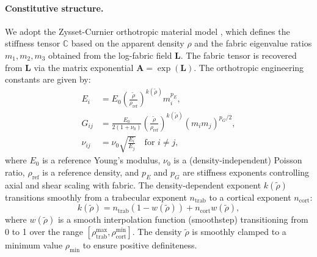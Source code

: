 \paragraph{Constitutive structure.}
We adopt the Zysset-Curnier orthotropic material model \cite{Zysset1995_AlternativeModelAnisotropic}, which defines the stiffness tensor $\mathbb{C}$ based on the apparent density $\rho$ and the fabric eigenvalue ratios $m_1, m_2, m_3$ obtained from the log-fabric field $\mathbf{L}$. The fabric tensor is recovered from $\mathbf{L}$ via the matrix exponential $\mathbf{A} = \exp(\mathbf{L})$.
The orthotropic engineering constants are given by:
\begin{equation}\label{eq:zysset-curnier}
\begin{aligned}
    E_i &= E_0 \left(\frac{\widetilde{\rho}}{\rho_{\mathrm{ref}}}\right)^{k(\widetilde{\rho})} m_i^{p_E}, \\
    G_{ij} &= \frac{E_0}{2(1+\nu_0)} \left(\frac{\widetilde{\rho}}{\rho_{\mathrm{ref}}}\right)^{k(\widetilde{\rho})} (m_i m_j)^{p_G/2}, \\
    \nu_{ij} &= \nu_0 \sqrt{\frac{E_i}{E_j}} \quad \text{for } i\neq j,
\end{aligned}
\end{equation}
where $E_0$ is a reference Young's modulus, $\nu_0$ is a (density-independent) Poisson ratio, $\rho_{\mathrm{ref}}$ is a reference density, and $p_E$ and $p_G$ are stiffness exponents controlling axial and shear scaling with fabric. The density-dependent exponent $k(\widetilde{\rho})$ transitions smoothly from a trabecular exponent $n_{\mathrm{trab}}$ to a cortical exponent $n_{\mathrm{cort}}$:
\begin{equation}\label{eq:variable-exponent}
k(\widetilde{\rho}) = n_{\mathrm{trab}} (1 - w(\widetilde{\rho})) + n_{\mathrm{cort}} w(\widetilde{\rho}),
\end{equation}
where $w(\widetilde{\rho})$ is a smooth interpolation function (smoothstep) transitioning from 0 to 1 over the range $[\rho_{\mathrm{trab}}^{\max}, \rho_{\mathrm{cort}}^{\min}]$. The density $\widetilde{\rho}$ is smoothly clamped to a minimum value $\rho_{\min}$ to ensure positive definiteness.
